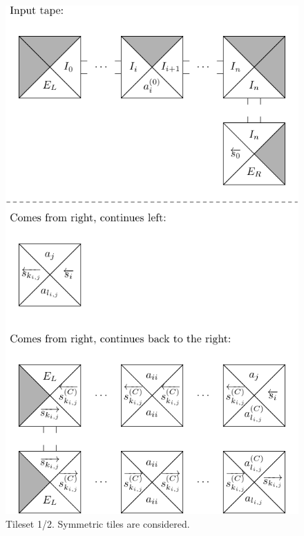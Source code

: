 		\begin{figure}[h]
		\begin{center}
			\includegraphics{./figures/tiles1.pdf}
			\caption{Tileset 1/2. Symmetric tiles are considered.}
			\label{fig:tileset1}
		\end{center}
		\end{figure}
		
